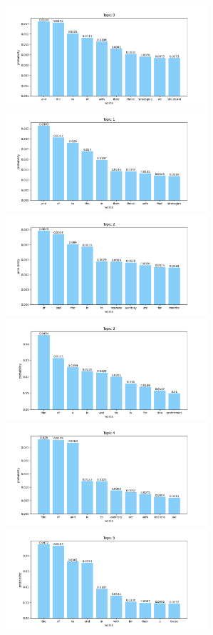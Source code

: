\documentclass[10pt]{article} %
\begin{document}
	\begin{center}
		\includegraphics[width=7.5cm]{images/plots/test_8/topic_0.png}
		\includegraphics[width=7.5cm]{images/plots/test_8/topic_1.png}
		\includegraphics[width=7.5cm]{images/plots/test_8/topic_2.png}
		\includegraphics[width=7.5cm]{images/plots/test_8/topic_3.png}
		\includegraphics[width=7.5cm]{images/plots/test_8/topic_4.png}
		\includegraphics[width=7.5cm]{images/plots/test_8/topic_5.png}

\end{center}
\end{document}
